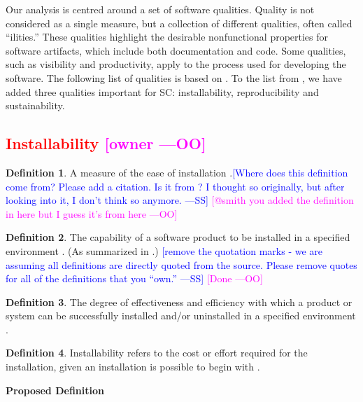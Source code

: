 \documentclass[letterpaper,cleveref]{lipics-v2019}
\newcommand{\authornote}[3]{\textcolor{#1}{[#3 ---#2]}}
\newcommand{\authornote}[3]{}
\newcommand{\wss}[1]{\authornote{blue}{SS}{#1}} %
\newcommand{\oo}[1]{\authornote{magenta}{OO}{#1}} %
\newcommand{\notdone}[1]{\textcolor{red}{#1}}
\theoremstyle{definition}
\newtheorem{defn}{Definition}
\begin{document}
Our analysis is centred around a set of software qualities.  Quality is not
considered as a single measure, but a collection of different qualities, often
called ``ilities.''  These qualities highlight the desirable nonfunctional
properties for software artifacts, which include both documentation and
code. Some qualities, such as visibility and productivity, apply to the process
used for developing the software. The following list of qualities is based on
\cite{GhezziEtAl2003}. To the list from \cite{GhezziEtAl2003}, we have added
three qualities important for SC: installability, reproducibility and
sustainability.

\subsection{\notdone{Installability} \oo{owner}}

\begin{defn}
	A measure of the ease of installation \citep{smith2015comparing}.\wss{Where
	does this definition come from? Please add a citation.  Is it from
	\citet{McCallEtAl1977}? I thought so originally, but after looking into it, I
	don't think so anymore.}
	\oo{@smith you added the definition in here but I guess it's from here}
\end{defn}

\begin{defn}
	The capability of a software product to be installed in a specified
	environment \citep{iso2001iec}. (As summarized in \citep{berander2005software}.)  \wss{remove the quotation marks -
	we are assuming all definitions are directly quoted from the source. Please
	remove quotes for all of the definitions that you ``own.''}
    \oo{Done} 
\end{defn}

\begin{defn} \label{Installability_Selected2}
	The degree of effectiveness and efficiency with which a product or system can
	be successfully installed and/or uninstalled in a specified environment
	\citep{ISO/IEC25010}.
\end{defn}

\begin{defn} \label{Installability_Selected1}
	Installability refers to the cost or effort required for the installation, given an installation is possible to begin with
	\citep{lenhard2013measuring}.
\end{defn}

\noindent \textbf{Proposed Definition}
\end{document}
